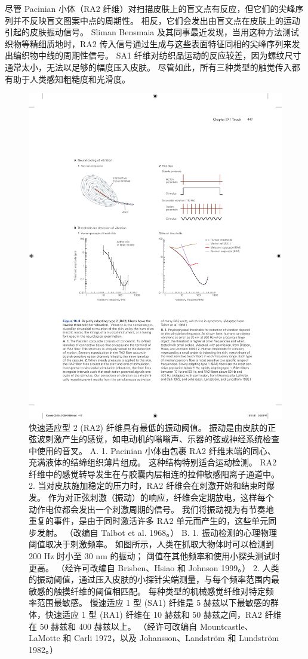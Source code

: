 尽管 Pacinian 小体（RA2 纤维）对扫描皮肤上的盲文点有反应，但它们的尖峰序列并不反映盲文图案中点的周期性。 
相反，它们会发出由盲文点在皮肤上的运动引起的皮肤振动信号。 
Sliman Bensmaia 及其同事最近发现，当用这种方法测试织物等精细质地时，RA2 传入信号通过生成与这些表面特征同相的尖峰序列来发出编织物中线的周期性信号。 
SA1 纤维对纺织品运动的反应较差，因为螺纹尺寸通常太小，无法以足够的幅度压入皮肤。 
尽管如此，所有三种类型的触觉传入都有助于人类感知粗糙度和光滑度。


\begin{figure}[htbp]
	\centering
	\includegraphics[width=0.5\linewidth]{chap19/fig_19_8}
	\caption{快速适应型 2 (RA2) 纤维具有最低的振动阈值。 
		振动是由皮肤的正弦波刺激产生的感觉，如电动机的嗡嗡声、乐器的弦或神经系统检查中使用的音叉。 
		A. 1. Pacinian 小体由包裹 RA2 纤维末端的同心、充满液体的结缔组织薄片组成。 这种结构特别适合运动检测。 
		RA2 纤维中的感觉转导发生在与胶囊内层相连的拉伸敏感阳离子通道中。 
		2. 当对皮肤施加稳定的压力时，RA2 纤维会在刺激开始和结束时爆发。 
		作为对正弦刺激（振动）的响应，纤维会定期放电，这样每个动作电位都会发出一个刺激周期的信号。 
		我们将振动视为有节奏地重复的事件，是由于同时激活许多 RA2 单元而产生的，这些单元同步发射。 （改编自 Talbot et al. 1968。） 
		B. 1. 振动检测的心理物理阈值取决于刺激频率。 
		如图所示，人类在抓取大物体时可以检测到 200 Hz 时小至 30 nm 的振动； 阈值在其他频率和使用小探头测试时更高。 （经许可改编自 Brisben、Hsiao 和 Johnson 1999。） 
		2. 人类的振动阈值，通过压入皮肤的小探针尖端测量，与每个频率范围内最敏感的触摸纤维的阈值相匹配。 
		每种类型的机械感觉纤维对特定频率范围最敏感。 
		慢速适应 1 型 (SA1) 纤维是 5 赫兹以下最敏感的群体，快速适应 1 型 (RA1) 纤维在 10 赫兹和 50 赫兹之间，RA2 纤维在 50 赫兹和 400 赫兹以上。 （经许可改编自 Mountcastle、LaMotte 和 Carli 1972，以及 Johansson、Landström 和 Lundström 1982。）}
	\label{fig:19_8}
\end{figure}



